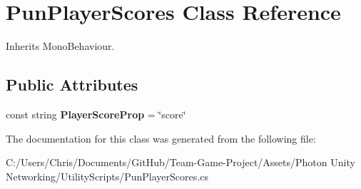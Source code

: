 \hypertarget{class_pun_player_scores}{}\section{Pun\+Player\+Scores Class Reference}
\label{class_pun_player_scores}


Inherits Mono\+Behaviour.

\subsection*{Public Attributes}
\begin{DoxyCompactItemize}
\item 
const string {\bfseries Player\+Score\+Prop} = \char`\"{}score\char`\"{}\hypertarget{class_pun_player_scores_a654bdaef3545c4463442239792198265}{}\label{class_pun_player_scores_a654bdaef3545c4463442239792198265}

\end{DoxyCompactItemize}


The documentation for this class was generated from the following file\+:\begin{DoxyCompactItemize}
\item 
C\+:/\+Users/\+Chris/\+Documents/\+Git\+Hub/\+Team-\/\+Game-\/\+Project/\+Assets/\+Photon Unity Networking/\+Utility\+Scripts/Pun\+Player\+Scores.\+cs\end{DoxyCompactItemize}
